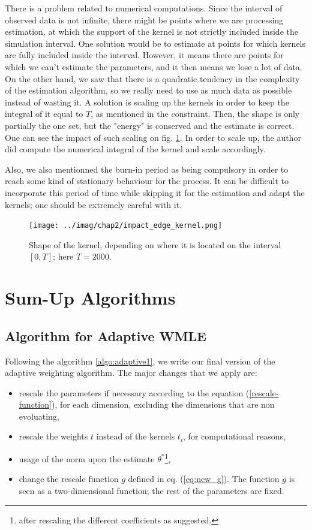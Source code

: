 \documentclass[11pt]{book}
\begin{document}
There is a problem related to numerical computations. Since the interval of observed data is not infinite, there might be points where we are processing estimation, at which the support of the kernel is not strictly included inside the simulation interval. One solution would be to estimate at points for which kernels are fully included inside the interval. However, it means there are points for which we can't estimate the parameters, and it then means we lose a lot of data. On the other hand, we saw that there is a quadratic tendency in the complexity of the estimation algorithm, so we really need to use as much data as possible instead of wasting it. A solution is scaling up the kernels in order to keep the integral of it equal to $T$, as mentioned in the constraint. Then, the shape is only partially the one set, but the "energy" is conserved and the estimate is correct. One can see the impact of such scaling on fig. \ref{fig:scaling_kernels}. In order to scale up, the author did compute the numerical integral of the kernel and scale accordingly.

Also, we also mentionned the burn-in period as being compulsory in order to reach some kind of stationary behaviour for the process. It can be difficult to incorporate this period of time while skipping it for the estimation and adapt the kernels; one should be extremely careful with it.



\begin{figure}
\centering
\texttt{[image: ../imag/chap2/impact\_edge\_kernel.png]}
\caption{Shape of the kernel, depending on where it is located on the interval $[0,T]$; here $T = 2000$.}
\label{fig:scaling_kernels}
\end{figure}



\section{Sum-Up Algorithms}
\subsection{Algorithm for Adaptive WMLE}
Following the algorithm \ref{algo:adaptive1}, we write our final version of the adaptive weighting algorithm. The major changes that we apply are:

\begin{itemize}
\item rescale the parameters if necessary according to the equation (\ref{rescale-function}), for each dimension, excluding the dimensions that are non evoluating,
\item rescale the weights $t$ instead of the kernels $t_i$, for computational reasons,
\item usage of the norm upon the estimate $\theta^*$\footnote{after rescaling the different coefficients as suggested.},
\item change the rescale function $g$ defined in eq. (\ref{eq:new_g}). The function $g$ is seen as a two-dimensional function; the rest of the parameters are fixed.
\end{itemize}
\end{document}
